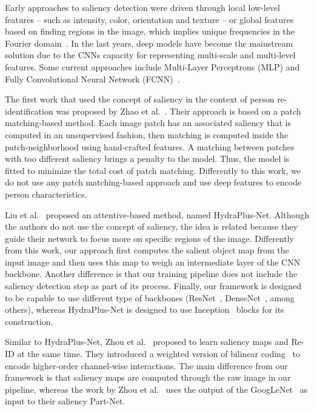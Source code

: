 \documentclass[final,3p,times,twocolumn]{elsarticle}
\begin{document}
Early approaches to saliency detection were driven through local low-level features -- such as intensity, color, orientation and texture -- or global features based on finding regions in the image, which implies unique frequencies in the Fourier domain~\cite{goferman2012context}. In the last years, deep models have become the mainstream solution due to the CNNs capacity for representing multi-scale and multi-level features. Some current approaches include Multi-Layer Perceptrons (MLP) and Fully Convolutional Neural Network (FCNN)~\cite{borji2017salient}.

The first work that used the concept of saliency in the context of person re-identification was proposed by Zhao et al.~\cite{zhao2013person}. Their approach is based on a patch matching-based method. Each image patch has an associated saliency that is computed in an unsupervised fashion, then matching is computed inside the patch-neighborhood using hand-crafted features. A matching between patches with too different saliency brings a penalty to the model. Thus, the model is fitted to minimize the total cost of patch matching. Differently to this work, we do not use any patch matching-based approach and use deep features to encode person characteristics.

Liu et al.~\cite{liu2017hydraplus} proposed an attentive-based method, named HydraPlus-Net. Although the authors do not use the concept of saliency, the idea is related because they guide their network to focus more on specific regions of the image. Differently from this work, our approach first computes the salient object map from the input image and then uses this map to weigh an intermediate layer of the CNN backbone. Another difference is that our training pipeline does not include the saliency detection step as part of its process. Finally, our framework is designed to be capable to use different type of backbones (ResNet~\cite{he2016deep}, DenseNet~\cite{huang2017densely}, among others), whereas HydraPlus-Net is designed to use Inception~\cite{szegedy2015going} blocks for its construction.

Similar to HydraPlus-Net, Zhou et al.~\cite{zhou2018weighted} proposed to learn saliency maps and Re-ID at the same time. They introduced a weighted version of bilinear coding~\cite{lin2015bilinear} to encode higher-order channel-wise interactions. The main difference from our framework is that saliency maps are computed through the raw image in our pipeline, whereas the work by Zhou et al.~\cite{zhou2018weighted} uses the output of the GoogLeNet~\cite{szegedy2015going} as input to their saliency Part-Net.
\end{document}
